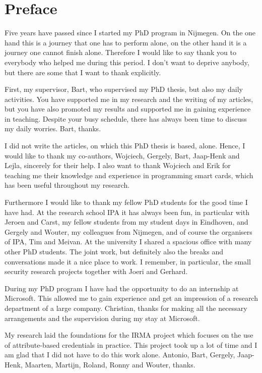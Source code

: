 \chapter*{Preface}

Five years have passed since I started my PhD program in Nijmegen. On the one
hand this is a journey that one has to perform alone, on the other hand it is a
journey one cannot finish alone. Therefore I would like to say thank you to 
everybody who helped me during this period. I don't want to deprive anybody, 
but there are some that I want to thank explicitly.

First, my supervisor, Bart, who supervised my PhD thesis, but also my daily
activities. You have supported me in my research and the writing of my articles,
but you have also promoted my results and supported me in gaining experience in 
teaching. Despite your busy schedule, there has always been time to discuss my 
daily worries. Bart, thanks.

I did not write the articles, on which this PhD thesis is based, alone. Hence,
I would like to thank my co-authors, Wojciech, Gergely, Bart, Jaap-Henk and 
Lejla, sincerely for their help. I also want to thank Wojciech and Erik for 
teaching me their knowledge and experience in programming smart cards, which 
has been useful throughout my research.

Furthermore I would like to thank my fellow PhD students for the good time I 
have had. At the research school IPA it has always been fun, in particular with
Jeroen and Carst, my fellow students from my student days in Eindhoven, and 
Gergely and Wouter, my colleagues from Nijmegen, and of course the organisers 
of IPA, Tim and Meivan. At the university I shared a spacious office with many
other PhD students. The joint work, but definitely also the breaks and
conversations made it a nice place to work. I remember, in particular, the 
small security research projects together with Joeri and Gerhard.

During my PhD program I have had the opportunity to do an internship at 
Microsoft. This allowed me to gain experience and get an impression of a 
research department of a large company. Christian, thanks for making all the 
necessary arrangements and the supervision during my stay at Microsoft.

My research laid the foundations for the IRMA project which focuses on the use 
of attribute-based credentials in practice. This project took up a lot of time 
and I am glad that I did not have to do this work alone. Antonio, Bart, Gergely,
Jaap-Henk, Maarten, Martijn, Roland, Ronny and Wouter, thanks.

